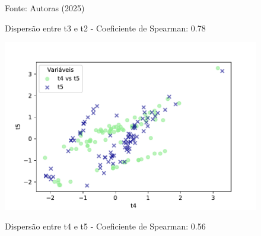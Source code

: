 \begin{figure}[h]
\begin{minipage}[b]{0.45\linewidth}
        \caption{Dispersão entre t3 e t2 - Coeficiente de Spearman: 0.78}
        \vspace{0.3cm}
        \begin{minipage}{\linewidth}
            \centering
            \scriptsize{Fonte: Autoras (2025)}
        \end{minipage}
    \end{minipage}
\end{figure}
\FloatBarrier

\begin{figure}[h]
    \captionsetup{font=footnotesize, justification=centering, labelsep=period, position=above}
    \centering
    \begin{minipage}[b]{0.45\linewidth}
        \label{fig:t4-t5}
        \centering
        \includegraphics[scale=0.48]{figuras/Spearman/t4-t5.pdf}
        \caption{Dispersão entre t4 e t5 - Coeficiente de Spearman: 0.56}
        \vspace{0.3cm}
        \begin{minipage}{\linewidth}
            \centering
        \end{minipage}
    \end{minipage}
    \hspace{0.05\linewidth}

\end{figure}
